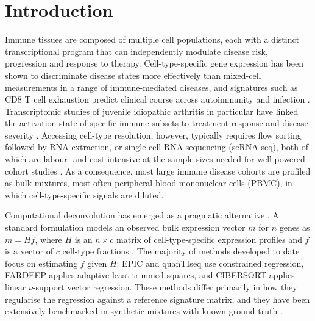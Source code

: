 \section{Introduction}

Immune tissues are composed of multiple cell populations, each with a distinct transcriptional program that can independently modulate disease risk, progression and response to therapy. Cell-type-specific gene expression has been shown to discriminate disease states more effectively than mixed-cell measurements in a range of immune-mediated diseases, and signatures such as CD8 T cell exhaustion predict clinical course across autoimmunity and infection \cite{mckinney2015tcell}. Transcriptomic studies of juvenile idiopathic arthritis in particular have linked the activation state of specific immune subsets to treatment response and disease severity \cite{throm2018juvenile}. Accessing cell-type resolution, however, typically requires flow sorting followed by RNA extraction, or single-cell RNA sequencing (scRNA-seq), both of which are labour- and cost-intensive at the sample sizes needed for well-powered cohort studies \cite{oelen2022singlecell,monaco2019rnaseq}. As a consequence, most large immune disease cohorts are profiled as bulk mixtures, most often peripheral blood mononuclear cells (PBMC), in which cell-type-specific signals are diluted.

Computational deconvolution has emerged as a pragmatic alternative \cite{avilacobos2020benchmarking}. A standard formulation models an observed bulk expression vector $m$ for $n$ genes as $m = H f$, where $H$ is an $n \times c$ matrix of cell-type-specific expression profiles and $f$ is a vector of $c$ cell-type fractions \cite{shenorr2010cssam}. The majority of methods developed to date focus on estimating $f$ given $H$: EPIC \cite{racle2017epic} and quanTIseq \cite{finotello2019quantiseq} use constrained regression, FARDEEP \cite{hao2019fardeep} applies adaptive least-trimmed squares, and CIBERSORT \cite{newman2015robust} applies linear $\nu$-support vector regression. These methods differ primarily in how they regularise the regression against a reference signature matrix, and they have been extensively benchmarked in synthetic mixtures with known ground truth \cite{avilacobos2020benchmarking}.

